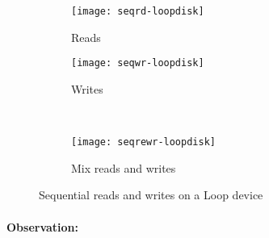 \begin{figure}[!ht]
  \begin{subfigure}[b]{0.2\textwidth}
  \texttt{[image: seqrd-loopdisk]}
  \caption{Reads}
  \label{subfig:seqrd-loopdisk}
  \end{subfigure}
  \hspace{50mm}
  \begin{subfigure}[b]{0.2\textwidth}
  \texttt{[image: seqwr-loopdisk]}
  \caption{Writes}
  \label{subfig:seqwr-loopdisk}
  \end{subfigure}\\
  \begin{subfigure}[b]{0.3\textwidth}
  \texttt{[image: seqrewr-loopdisk]}
  \caption{Mix reads and writes}
  \label{subfig:seqrewe-loopdisk}
  \end{subfigure}
\caption{Sequential reads and writes on a Loop device}\label{fig:seqloopdisk}
\end{figure}


\paragraph{Observation:}





